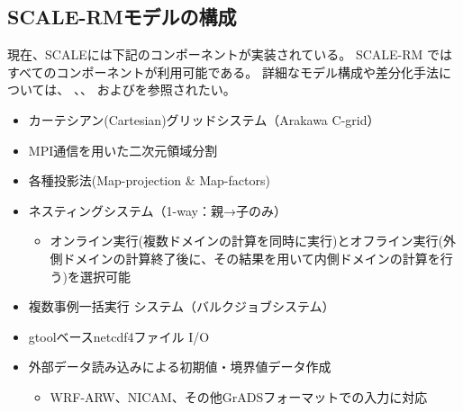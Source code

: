 \subsection{SCALE-RMモデルの構成}
現在、SCALEには下記のコンポーネントが実装されている。
SCALE-RM ではすべてのコンポーネントが利用可能である。
詳細なモデル構成や差分化手法については、
\citet{scale_2015}、\citet{satoy_2015b}、
および\citet{nishizawa_2015}を参照されたい。\\


\begin{itemize}
 \item カーテシアン(Cartesian)グリッドシステム（Arakawa C-grid）
 \item MPI通信を用いた二次元領域分割
 \item 各種投影法(Map-projection \& Map-factors)
 \item ネスティングシステム（1-way：親→子のみ）
   \begin{itemize}
    \item オンライン実行(複数ドメインの計算を同時に実行)とオフライン実行(外側ドメインの計算終了後に、その結果を用いて内側ドメインの計算を行う)を選択可能
   \end{itemize}
 \item 複数事例一括実行 システム（バルクジョブシステム）
 \item gtoolベースnetcdf4ファイル I/O
 \item 外部データ読み込みによる初期値・境界値データ作成
   \begin{itemize}
    \item WRF-ARW、NICAM、その他GrADSフォーマットでの入力に対応
   \end{itemize}
\end{itemize}

